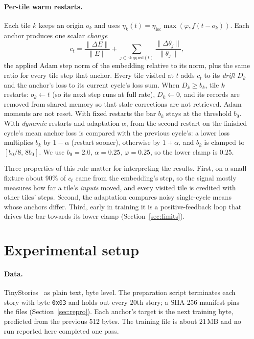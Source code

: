 \documentclass[10pt]{article}
\begin{document}
\paragraph{Per-tile warm restarts.} Each tile $k$ keeps an origin $o_k$ and uses
$\eta_k(t)=\eta_{\text{loc}}\max(\varphi, f(t-o_k))$. Each anchor produces one scalar \emph{change}
\begin{equation}
  c_t = \frac{\lVert \Delta E\rVert}{\lVert E\rVert} + \sum_{j\in\text{stepped}(t)} \frac{\lVert\Delta\theta_j\rVert}{\lVert\theta_j\rVert},
\end{equation}
the applied Adam step norm of the embedding relative to its norm, plus the same ratio for every tile
step that anchor. Every tile visited at $t$ adds $c_t$ to its \emph{drift} $D_k$ and the anchor's loss
to its current cycle's loss sum. When $D_k\ge b_k$, tile $k$ restarts: $o_k\leftarrow t$ (so its next
step runs at full rate), $D_k\leftarrow 0$, and its records are removed from shared memory so that stale
corrections are not retrieved. Adam moments are not reset. With fixed restarts the bar $b_k$ stays at the
threshold $b_0$. With \emph{dynamic} restarts and adaptation $\alpha$, from the second restart on the
finished cycle's mean anchor loss is compared with the previous cycle's: a lower loss multiplies $b_k$
by $1-\alpha$ (restart sooner), otherwise by $1+\alpha$, and $b_k$ is clamped to $[b_0/8,\,8b_0]$. We use
$b_0=2.0$, $\alpha=0.25$, $\varphi=0.25$, so the lower clamp is 0.25.

Three properties of this rule matter for interpreting the results. First, on a small fixture about 90\%
of $c_t$ came from the embedding's step, so the signal mostly measures how far a tile's \emph{inputs}
moved, and every visited tile is credited with other tiles' steps. Second, the adaptation compares
noisy single-cycle means whose anchors differ. Third, early in training it is a positive-feedback
loop that drives the bar towards its lower clamp (Section~\ref{sec:limits}).

\section{Experimental setup}
\label{sec:setup}

\paragraph{Data.} TinyStories~\citep{eldan2023tinystories} as plain text, byte level. The preparation
script terminates each story with byte \texttt{0x03} and holds out every 20th story; a SHA-256
manifest pins the files (Section~\ref{sec:repro}). Each anchor's target is the next training byte,
predicted from the previous 512 bytes. The training file is about 21\,MB and no run reported here
completed one pass.
\end{document}

